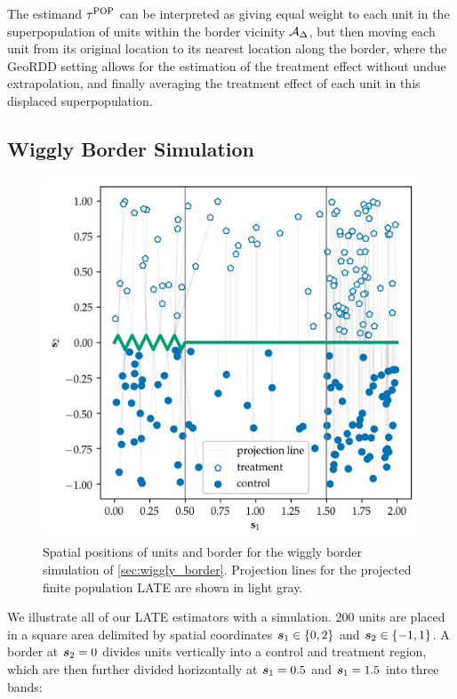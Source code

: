 \documentclass[letter,12pt]{article}
\begin{document}
The estimand \(\tau^{\mathrm{POP}}\) can be interpreted as giving equal weight to each unit in the superpopulation of units within the border vicinity \(\mathcal{A}_\Delta\), but then moving each unit from its original location to its nearest location along the border, where the GeoRDD setting allows for the estimation of the treatment effect without undue extrapolation, and finally averaging the treatment effect of each unit in this displaced superpopulation.



\subsection{Wiggly Border Simulation}
\label{sec:wiggly_border}
    

\begin{figure}[tbp]
\centering
\includegraphics[height=0.35\textheight]{../figures/wiggly_boundaries_setup.png}
\caption{\label{fig:wiggly_boundaries_setup}Spatial positions of units and border for the wiggly border simulation of \autoref{sec:wiggly_border}. Projection lines for the projected finite population LATE are shown in light gray.}
\end{figure}
    

We illustrate all of our LATE estimators with a simulation.
200 units are placed in a square area delimited by spatial coordinates \(\bm{s}_1 \in \left\lbrace0,2\right\rbrace\) and \(\bm{s}_2 \in \left\lbrace-1, 1\right\rbrace\).
A border at \(\bm{s}_2=0\) divides units vertically into a control and treatment region,
which are then further divided horizontally at \(\bm{s}_1=0.5\) and \(\bm{s}_1=1.5\) into three bands:
\end{document}
